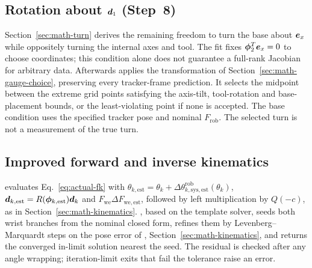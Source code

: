 \documentclass[../main.tex]{subfiles}
\begin{document}
\subsection{Rotation about \texorpdfstring{$\bm{d}_1$}{d1} (Step~8)}\label{sec:alg-gauge}
Section~\ref{sec:math-turn} derives the remaining freedom to turn the base about $\bm{e}_x$ while oppositely turning the internal axes and tool. The fit fixes $\bm{\phi}_2^T\bm{e}_x=0$ to choose coordinates; this condition alone does not guarantee a full-rank Jacobian for arbitrary data. Afterwards  applies the transformation of Section~\ref{sec:math-gauge-choice}, preserving every tracker-frame prediction. It selects the midpoint between the extreme grid points satisfying the axis-tilt, tool-rotation and base-placement bounds, or the least-violating point if none is accepted. The base condition uses the specified tracker pose and nominal $F_{\mathrm{rob}}$. The selected turn is not a measurement of the true turn.
\subsection{Improved forward and inverse kinematics}\label{sec:alg-ik}
 evaluates Eq.~\eqref{eq:actual-fk} with $\theta_{k,\mathrm{est}}=\theta_k+\Delta\theta^{\mathrm{rob}}_{k,\mathrm{sys},\mathrm{est}}(\theta_k)$, $\bm{d}_{k,\mathrm{est}}=R(\bm{\phi}_{k,\mathrm{est}})\bm{d}_k$ and $F_{\mathrm{we}}\Delta F_{\mathrm{we},\mathrm{est}}$, followed by left multiplication by $Q(-c)$, as in Section~\ref{sec:math-kinematics}. , based on the template solver, seeds both wrist branches from the nominal closed form, refines them by Levenberg--Marquardt steps on the pose error of , Section~\ref{sec:math-kinematics}, and returns the converged in-limit solution nearest the seed. The residual is checked after any angle wrapping; iteration-limit exits that fail the tolerance raise an error.
\end{document}
